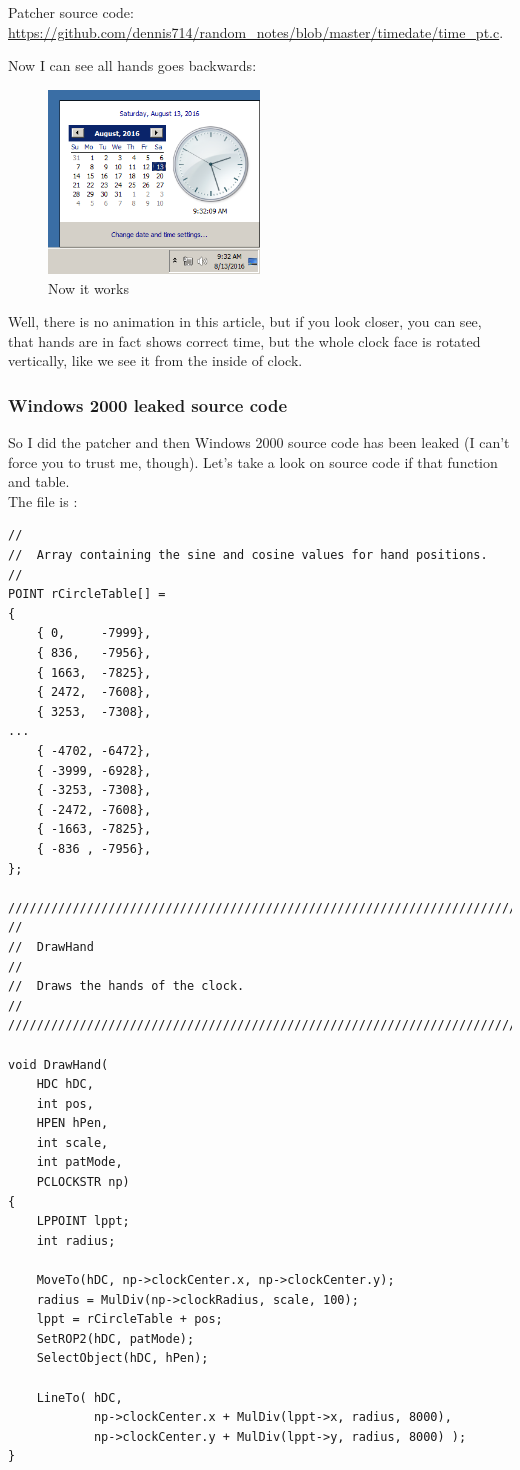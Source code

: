 Patcher source code: \url{https://github.com/dennis714/random_notes/blob/master/timedate/time_pt.c}.

Now I can see all hands goes backwards:

\begin{figure}[H]
\centering
\includegraphics[width=0.5\textwidth]{examples/timedate/counterclockwise.png}
\caption{Now it works}
\end{figure}

Well, there is no animation in this article, but if you look closer, you can see, that hands are in fact shows correct
time, but the whole clock face is rotated vertically, like we see it from the inside of clock.

\subsubsection{Windows 2000 leaked source code}

So I did the patcher and then Windows 2000 source code has been leaked (I can't force you to trust me, though).
Let's take a look on source code if that function and table.\\
The file is :

\begin{lstlisting}
//
//  Array containing the sine and cosine values for hand positions.
//
POINT rCircleTable[] =
{
    { 0,     -7999},
    { 836,   -7956},
    { 1663,  -7825},
    { 2472,  -7608},
    { 3253,  -7308},
...
    { -4702, -6472},
    { -3999, -6928},
    { -3253, -7308},
    { -2472, -7608},
    { -1663, -7825},
    { -836 , -7956},
};

////////////////////////////////////////////////////////////////////////////
//
//  DrawHand
//
//  Draws the hands of the clock.
//
////////////////////////////////////////////////////////////////////////////

void DrawHand(
    HDC hDC,
    int pos,
    HPEN hPen,
    int scale,
    int patMode,
    PCLOCKSTR np)
{
    LPPOINT lppt;
    int radius;

    MoveTo(hDC, np->clockCenter.x, np->clockCenter.y);
    radius = MulDiv(np->clockRadius, scale, 100);
    lppt = rCircleTable + pos;
    SetROP2(hDC, patMode);
    SelectObject(hDC, hPen);

    LineTo( hDC,
            np->clockCenter.x + MulDiv(lppt->x, radius, 8000),
            np->clockCenter.y + MulDiv(lppt->y, radius, 8000) );
}
\end{lstlisting}

